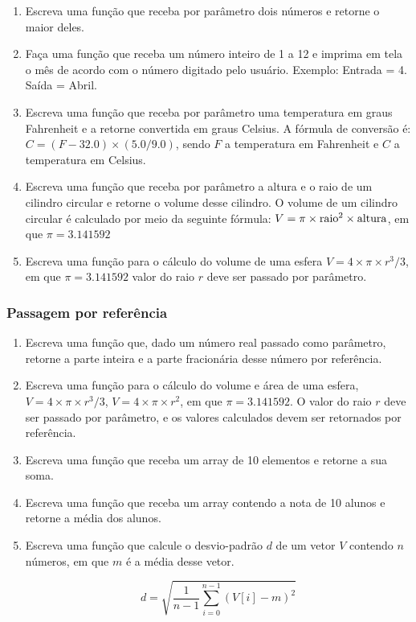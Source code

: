 \documentclass[a4paper,12pt]{article}
\begin{document}
\begin{enumerate}
  \item Escreva uma função que receba por parâmetro dois números e retorne o maior deles.
  \item Faça uma função que receba um número inteiro de 1 a 12 e imprima em tela o mês de acordo com o número digitado pelo usuário. Exemplo: Entrada = 4. Saída = Abril.
  \item Escreva uma função que receba por parâmetro uma temperatura em graus Fahrenheit e a retorne convertida em graus Celsius. A fórmula de conversão é: $C = (F - 32.0) \times (5.0/9.0)$, sendo $F$ a temperatura em Fahrenheit e $C$ a temperatura em Celsius.
  \item Escreva uma função que receba por parâmetro a altura e o raio de um cilindro circular e retorne o volume desse cilindro. O volume de um cilindro circular é calculado por meio da seguinte fórmula: $V = \pi \times \textnormal{raio}^2 \times \textnormal{altura}$, em que $\pi = 3.141592$
  \item Escreva uma função para o cálculo do volume de uma esfera $V = 4 \times \pi \times r^3 / 3$, em que $\pi = 3.141592$ valor do raio $r$ deve ser passado por parâmetro.
\end{enumerate}

\subsubsection{Passagem por referência}

\begin{enumerate}
  \item Escreva uma função que, dado um número real passado como parâmetro, retorne a parte inteira e a parte fracionária desse número por referência.
  \item Escreva uma função para o cálculo do volume e área de uma esfera, $V = 4 \times \pi \times r^3 / 3$, $V = 4 \times \pi \times r^2$, em que $\pi = 3.141592$. O valor do raio $r$ deve ser passado por parâmetro, e os valores calculados devem ser retornados por referência.
  \item Escreva uma função que receba um array de 10 elementos e retorne a sua soma.
  \item Escreva uma função que receba um array contendo a nota de 10 alunos e retorne a média dos alunos.
  \item Escreva uma função que calcule o desvio-padrão $d$ de um vetor $V$ contendo $n$ números, em que $m$ é a média desse vetor.

  \begin{equation*}
    d = \sqrt{\frac{1}{n - 1} \sum_{i = 0}^{n - 1} (V[i] - m)^2}
  \end{equation*}
\end{enumerate}
\end{document}
